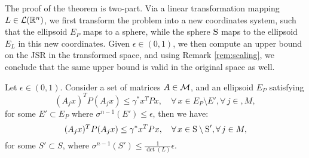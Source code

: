 The proof of the theorem is two-part. Via a linear transformation mapping $L \in\mathcal{L}(\mathbb{R}^n)$, we first transform the problem into a new coordinates system, such that the ellipsoid $E_P$ maps to a sphere, while the sphere $\text{S}$ maps to the ellipsoid $E_{L}$ in this new coordinates. Given $\epsilon \in (0, 1)$, we then compute an upper bound on the JSR in the transformed space, and using Remark \ref{rem:scaling}, we conclude that the same upper bound is valid in the original space as well.

\begin{lemma}\label{lemma:epsilon1}Let $\epsilon \in (0, 1)$. Consider a set of matrices $A \in \mathcal{M}$, and an ellipsoid $E_P$ satisfying
\begin{equation*}(A_jx)^TP(A_jx) \leq \gamma^* x^TPx, \quad \forall\, x \in E_P \setminus E', \forall\,j \in, M,\end{equation*}
for some $E' \subset E_P$ where $\sigma^{n-1}(E') \leq \epsilon$, then we have:
\begin{equation*}(A_jx)^TP(A_jx) \leq \gamma^* x^TPx, \quad \forall\, x \in \text{S} \setminus \text{S}', \forall\,j \in M,
\end{equation*}
for some $S' \subset S$, where $\sigma^{n-1}(S') \leq \frac{1}{\det(L)}\epsilon$.
\end{lemma}
